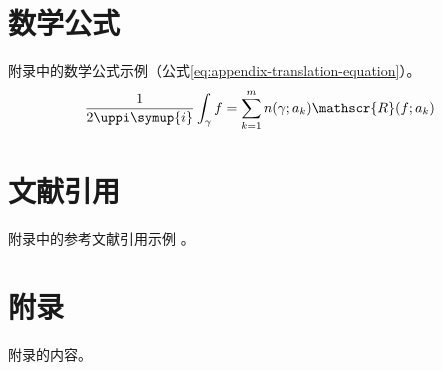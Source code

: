 \begin{translation}
\section{数学公式}

附录中的数学公式示例（公式\eqref{eq:appendix-translation-equation}）。
\begin{equation}
  \frac{1}{2 \uppi \symup{i}} \int_\gamma f = \sum_{k=1}^m n(\gamma; a_k) \mathscr{R}(f; a_k)
  \label{eq:appendix-translation-equation}
\end{equation}


\section{文献引用}

附录\cite{dupont1974bone}中的参考文献引用\cite{merkt1995rotational}示例
\cite{dupont1974bone,merkt1995rotational}。


\appendix

\section{附录}

附录的内容。



% 

\printbibliography

\begin{translation-index}
  \nocite{mellinger1996laser}
  \nocite{bixon1996dynamics}
  \nocite{carlson1981two}
  
  \printbibliography
\end{translation-index}

\end{translation}
